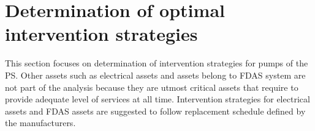 
\section{Determination of optimal intervention strategies}

This section focuses on determination of intervention strategies for pumps of the PS. Other assets such as electrical assets and assets belong to FDAS system are not part of the analysis because they are utmost critical assets that require to provide adequate level of services at all time. Intervention strategies for electrical assets and FDAS assets are suggested to follow replacement schedule defined by the manufacturers.
%

